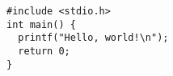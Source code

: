 \documentclass[12pt]{article}
\begin{document}
\begin{lstlisting}[caption={Sample code}]
#include <stdio.h>
int main() {
  printf("Hello, world!\n");
  return 0;
}
\end{lstlisting}
\end{document}
